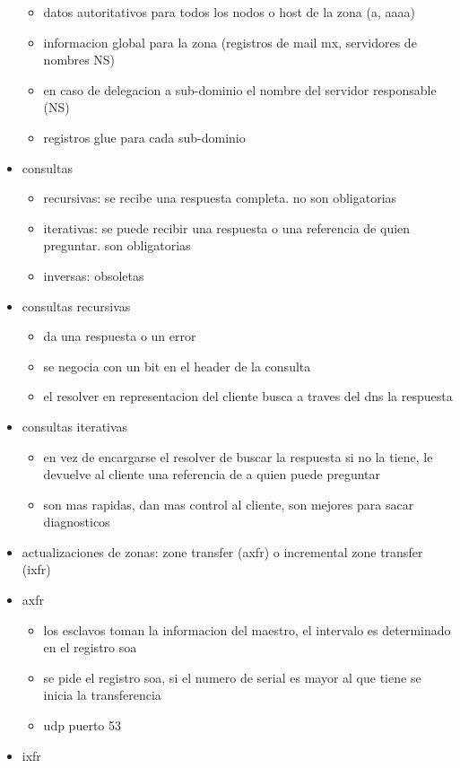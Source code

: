 \documentclass[11pt]{article}
\begin{document}
\begin{itemize}
\begin{itemize}
\item datos autoritativos para todos los nodos o host de la zona (a, aaaa)
\item informacion global para la zona (registros de mail mx, servidores de nombres NS)
\item en caso de delegacion a sub-dominio el nombre del servidor responsable (NS)
\item registros glue para cada sub-dominio
\end{itemize}
\item consultas
\begin{itemize}
\item recursivas: se recibe una respuesta completa. no son obligatorias
\item iterativas: se puede recibir una respuesta o una referencia de quien preguntar. son obligatorias
\item inversas: obsoletas
\end{itemize}
\item consultas recursivas
\begin{itemize}
\item da una respuesta o un error
\item se negocia con un bit en el header de la consulta
\item el resolver en representacion del cliente busca a traves del dns la respuesta
\end{itemize}
\item consultas iterativas
\begin{itemize}
\item en vez de encargarse el resolver de buscar la respuesta si no la tiene, le devuelve al cliente una referencia de a quien puede preguntar
\item son mas rapidas, dan mas control al cliente, son mejores para sacar diagnosticos
\end{itemize}
\item actualizaciones de zonas: zone transfer (axfr) o incremental zone transfer (ixfr)
\item axfr
\begin{itemize}
\item los esclavos toman la informacion del maestro, el intervalo es determinado en el registro soa
\item se pide el registro soa, si el numero de serial es mayor al que tiene se inicia la transferencia
\item udp puerto 53
\end{itemize}
\item ixfr

\end{itemize}
\end{document}
